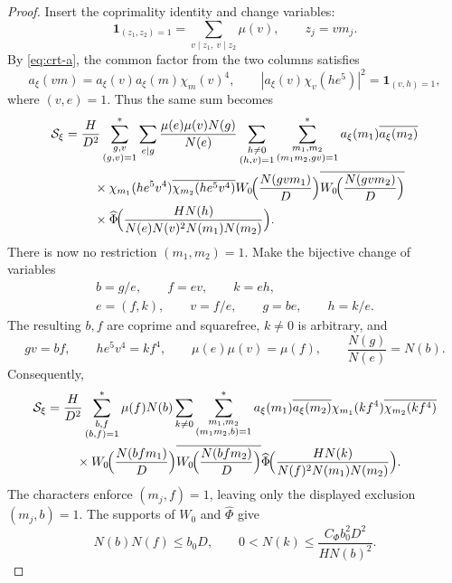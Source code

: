 \documentclass[11pt,a4paper]{article}
\numberwithin{equation}{section}
\numberwithin{figure}{section}
\theoremstyle{definition}
\theoremstyle{remark}
\newcommand{\ind}{\mathbf1}
\begin{document}
\begin{proof}
Insert the coprimality identity and change variables:
\[
 \ind_{(z_1,z_2)=1}
 =\sum_{v\mid z_1,\ v\mid z_2}\mu(v),
 \qquad z_j=vm_j.
\]
By \eqref{eq:crt-a}, the common factor from the two columns satisfies
\[
 a_\xi(vm)=a_\xi(v)a_\xi(m)\chi_m(v)^4,
 \qquad
 |a_\xi(v)\chi_v(he^5)|^2=\ind_{(v,h)=1},
\]
where $(v,e)=1$. Thus the same sum becomes
\[
 \begin{aligned}
 \mathcal S_\xi
 ={}&\frac H{D^2}
 \sum_{\substack{g,v\\(g,v)=1}}^*
 \sum_{e\mid g}\frac{\mu(e)\mu(v)N(g)}{N(e)}
 \sum_{\substack{h\ne0\\(h,v)=1}}
 \sum_{\substack{m_1,m_2\\(m_1m_2,gv)=1}}^*
 a_\xi(m_1)\overline{a_\xi(m_2)}
 \\
 &\quad{}\times
 \chi_{m_1}(he^5v^4)\overline{\chi_{m_2}(he^5v^4)}
 W_0\!\Bigl(\frac{N(gvm_1)}D\Bigr)
 \overline{W_0\!\Bigl(\frac{N(gvm_2)}D\Bigr)}
 \\
 &\quad{}\times
 \widehat\Phi\!\Bigl(
 \frac{HN(h)}{N(e)N(v)^2N(m_1)N(m_2)}
 \Bigr).
 \end{aligned}
\]
There is now no restriction $(m_1,m_2)=1$.
Make the bijective change of variables
\[
 \begin{gathered}
 b=g/e,\qquad f=ev,\qquad k=eh,\\
 e=(f,k),\qquad v=f/e,\qquad g=be,\qquad h=k/e.
 \end{gathered}
\]
The resulting $b,f$ are coprime and squarefree, $k\ne0$ is arbitrary,
and
\[
 gv=bf,\qquad he^5v^4=kf^4,\qquad
 \mu(e)\mu(v)=\mu(f),\qquad
 \frac{N(g)}{N(e)}=N(b).
\]
Consequently,
\begin{equation}\label{eq:initial-column-output}
 \begin{aligned}
 \mathcal S_\xi
 ={}&\frac H{D^2}
 \sum_{\substack{b,f\\(b,f)=1}}^*\mu(f)N(b)
 \sum_{k\ne0}
 \sum_{\substack{m_1,m_2\\(m_1m_2,b)=1}}^*
 a_\xi(m_1)\overline{a_\xi(m_2)}
 \chi_{m_1}(kf^4)\overline{\chi_{m_2}(kf^4)}
 \\
 &\quad{}\times
 W_0\!\Bigl(\frac{N(bfm_1)}D\Bigr)
 \overline{W_0\!\Bigl(\frac{N(bfm_2)}D\Bigr)}
 \widehat\Phi\!\Bigl(
 \frac{HN(k)}{N(f)^2N(m_1)N(m_2)}
 \Bigr).
 \end{aligned}
\end{equation}
The characters enforce $(m_j,f)=1$, leaving only the displayed
exclusion $(m_j,b)=1$.
The supports of $W_0$ and $\widehat\Phi$ give
\[
 N(b)N(f)\le b_0D,\qquad
 0<N(k)\le\frac{C_\Phi b_0^2D^2}{HN(b)^2}.
\]


\end{proof}
\end{document}
